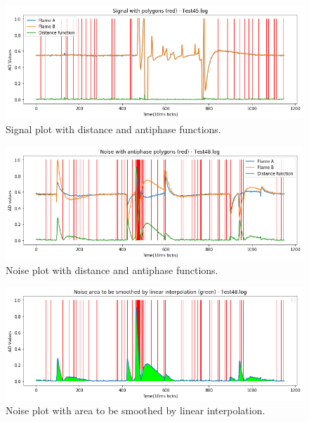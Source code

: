 \begin{figure}[tb]
 \centering %
 \includegraphics[width=\columnwidth]{pictures/06-signal-antiphase-distance.png}
 \caption{Signal plot with distance and antiphase functions.}
 \label{fig:sample}
\end{figure}

\begin{figure}[tb]
 \centering %
 \includegraphics[width=\columnwidth]{pictures/07-noise-antiphase-distance.png}
 \caption{Noise plot with distance and antiphase functions.}
 \label{fig:sample}
\end{figure}

\begin{figure}[tb]
 \centering %
 \includegraphics[width=\columnwidth]{pictures/08-noise-linear-interpolation-smoothing.png}
 \caption{Noise plot with area to be smoothed by linear interpolation.}
 \label{fig:sample}
\end{figure}

